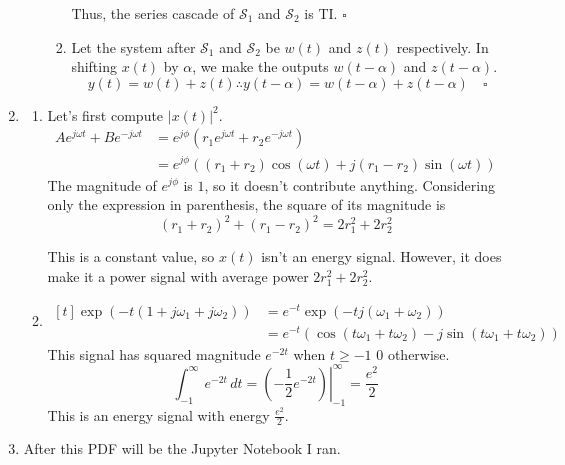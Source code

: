 \documentclass[12pt]{article}
\begin{document}
\begin{enumerate}
\begin{enumerate}
\begin{enumerate}
                                    Thus, the series cascade of $\mathcal{S}_1$ and $\mathcal{S}_2$ is TI. $\square$
                              \item Let the system after $\mathcal{S}_1$ and
                                    $\mathcal{S}_2$ be $w(t)$ and $z(t)$ respectively.
                                    In shifting $x(t)$ by $\alpha$, we make the outputs $w(t-\alpha)$ and $z(t-\alpha)$.
                                    \[y(t) = w(t) + z(t) \therefore y(t - \alpha) = w(t -\alpha) + z(t-\alpha)\quad\square\]
                        \end{enumerate}
            \end{enumerate}
      \item \begin{enumerate}
                  \item Let's first compute $|x(t)|^2$.
                        \begin{align*}
                              Ae^{j\omega t}+Be^{-j\omega t}
                               & = e^{j\phi}\left(r_1e^{j\omega t}+r_2e^{-j\omega t}\right)               \\
                               & = e^{j\phi}\left((r_1+r_2)\cos(\omega t)+j(r_1-r_2)\sin(\omega t)\right)
                        \end{align*}
                        The magnitude of $e^{j\phi}$ is $1$, so it doesn't contribute anything.
                        Considering only the expression in parenthesis,
                        the square of its magnitude is
                        \[(r_1+r_2)^2+(r_1-r_2)^2=2r_1^2+2r_2^2\]

                        This is a constant value, so $x(t)$ isn't an energy signal.
                        However, it does make it a power signal with
                        average power $\boxed{2r_1^2+2r_2^2}$.
                  \item \[\begin{aligned}[t]
                                    \exp(-t(1+j\omega_1+j\omega_2))
                                     & = e^{-t}\exp(-tj(\omega_1+\omega_2))                           \\
                                     & = e^{-t}(\cos(t\omega_1+t\omega_2)-j\sin(t\omega_1+t\omega_2))
                              \end{aligned}\]
                        This signal has squared magnitude $e^{-2t}$ when $t \ge -1$ $0$ otherwise.
                        \[\int_{-1}^{\infty} e^{-2t}\,dt = \left.\left(-\frac{1}{2}e^{-2t}\right)\right|^{\infty}_{-1}=\frac{e^2}{2}\]
                        This is an energy signal with energy $\boxed{\frac{e^2}{2}}$.
            \end{enumerate}
      \item After this PDF will be the Jupyter Notebook I ran.
\end{enumerate}
\end{document}
